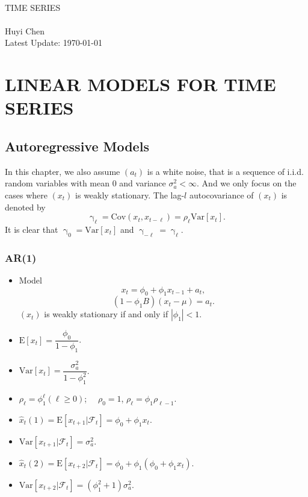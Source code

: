 \documentclass{report}
\theoremstyle{nonumberplain}
\newcommand{\E}{\mathrm{E}}
\newcommand{\Var}{\mathrm{Var}}
\newcommand{\Cov}{\mathrm{Cov}}
\newcommand{\0}{\mathbf{0}}
\begin{document}
	\begin{center}	
	~\\ 
	\vspace{6em} 
	\textsc{\Huge TIME SERIES}	
	~\\
	\vspace{2.5em} 
	{\Large }
	~\\
	\vspace{6em}
	\textsf{Huyi Chen}
	~\\
	\vspace{5in}  
	{\large Latest Update: \today}
	\end{center}

\chapter{LINEAR MODELS FOR TIME SERIES}
\section{Autoregressive Models}
In this chapter, we also assume $(a_t)$ is a white noise, that is a sequence of i.i.d. random variables with mean $0$ and variance $\sigma_a^2<\infty$. And we only focus on the cases where $(x_t)$ is weakly stationary. The lag-$l$ autocovariance of $(x_t)$ is denoted by
\[
\upgamma_\ell=\Cov(x_t,x_{t-\ell})=\rho_{\ell}\Var[x_t] .
\]
It is clear that $\upgamma_0=\Var[x_t]$ and $\upgamma_{-\ell}=\upgamma_{\ell}$.
\subsection{AR(1)}
\begin{itemize}
	\item Model
	\[
		x_{t}=\phi_0+\phi_1x_{t-1}+a_t,
	\]
	\[
		(1-\phi_1B)(x_{t}-\mu)=a_t.
	\]
	$(x_t)$ is weakly stationary if and only if $|\phi_1|<1$.
	\item $\E[x_t]=\dfrac{\phi_0}{1-\phi_1}$.
	\item $\Var[x_t]=\dfrac{\sigma_a^2}{1-\phi_1^2}$.
	\item $\rho_\ell=\phi_1^\ell(\ell\ge 0)$; $\quad\rho_0=1$, $\rho_\ell=\phi_1\rho_{\ell-1}$.
	\item $\hat{x}_t(1)=\E[x_{t+1}|\mathcal{F}_t]=\phi_0+\phi_1x_{t}$.
	\item $\Var[x_{t+1}|\mathcal{F}_t]=\sigma_a^2$.
	\item $\hat{x}_t(2)=\E[x_{t+2}|\mathcal{F}_t]=\phi_0+\phi_1(\phi_0+\phi_1x_{t})$.
	\item $\Var[x_{t+2}|\mathcal{F}_t]=(\phi_1^2+1)\sigma_a^2$.
\end{itemize}
\end{document}
